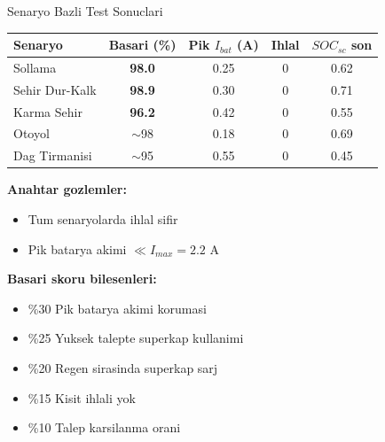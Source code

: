 \documentclass[10pt,aspectratio=169]{beamer}
\begin{document}
\begin{frame}{Senaryo Bazli Test Sonuclari}
\begin{center}
\begin{tabular}{lcccc}
\toprule
\textbf{Senaryo} & \textbf{Basari (\%)} & \textbf{Pik $I_{bat}$ (A)} & \textbf{Ihlal} & \textbf{$SOC_{sc}$ son} \\
\midrule
Sollama        & \textcolor{green!50!black}{\textbf{98.0}} & 0.25 & 0 & 0.62 \\
Sehir Dur-Kalk & \textcolor{green!50!black}{\textbf{98.9}} & 0.30 & 0 & 0.71 \\
Karma Sehir    & \textcolor{green!50!black}{\textbf{96.2}} & 0.42 & 0 & 0.55 \\
Otoyol         & $\sim$98 & 0.18 & 0 & 0.69 \\
Dag Tirmanisi  & $\sim$95 & 0.55 & 0 & 0.45 \\
\bottomrule
\end{tabular}
\end{center}

\vspace{0.5em}
\textbf{Anahtar gozlemler:}
\begin{itemize}\footnotesize
  \item Tum senaryolarda ihlal sifir
  \item Pik batarya akimi $\ll I_{max}=2.2$ A
\end{itemize}

\textbf{Basari skoru bilesenleri:}
\begin{itemize}\footnotesize
  \item \%30 Pik batarya akimi korumasi
  \item \%25 Yuksek talepte superkap kullanimi
  \item \%20 Regen sirasinda superkap sarj
  \item \%15 Kisit ihlali yok
  \item \%10 Talep karsilanma orani
\end{itemize}
\end{frame}
\end{document}
